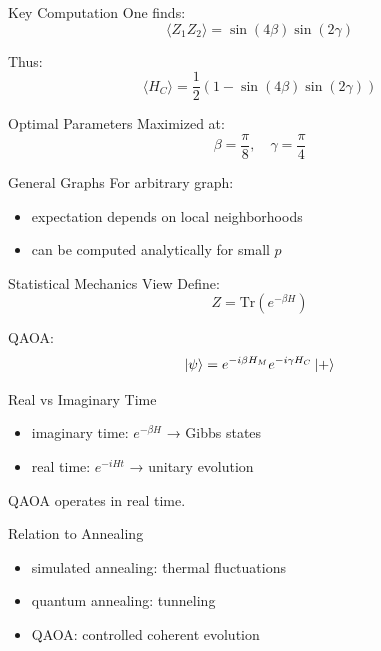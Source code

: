 \documentclass{beamer}
\begin{document}
\begin{frame}{Key Computation}
One finds:
\[
\langle Z_1 Z_2 \rangle = \sin(4\beta)\sin(2\gamma)
\]

Thus:
\[
\langle H_C \rangle = \frac{1}{2}(1-\sin(4\beta)\sin(2\gamma))
\]
\end{frame}

\begin{frame}{Optimal Parameters}
Maximized at:
\[
\beta = \frac{\pi}{8}, \quad \gamma = \frac{\pi}{4}
\]
\end{frame}

\begin{frame}{General Graphs}
For arbitrary graph:
\begin{itemize}
\item expectation depends on local neighborhoods
\item can be computed analytically for small $p$
\end{itemize}
\end{frame}

\begin{frame}{Statistical Mechanics View}
Define:
\[
Z = \mathrm{Tr}(e^{-\beta H})
\]

QAOA:
\[
\ket{\psi} = e^{-i\beta H_M} e^{-i\gamma H_C}\ket{+}
\]
\end{frame}

\begin{frame}{Real vs Imaginary Time}
\begin{itemize}
\item imaginary time: $e^{-\beta H}$ → Gibbs states
\item real time: $e^{-iHt}$ → unitary evolution
\end{itemize}

QAOA operates in real time.
\end{frame}

\begin{frame}{Relation to Annealing}
\begin{itemize}
\item simulated annealing: thermal fluctuations
\item quantum annealing: tunneling
\item QAOA: controlled coherent evolution
\end{itemize}
\end{frame}
\end{document}
